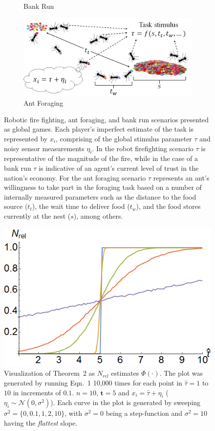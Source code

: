 \documentclass[12pt]{article}
\def\td{\mathbf{t}}   %
\begin{document}
\begin{figure}[ht!]
\begin{subfigure}[t]{0.41\textwidth}
        \caption{Bank Run}
    \end{subfigure}
    \begin{subfigure}[t]{.82\textwidth}
        \centering
        \includegraphics[width=1\textwidth]{figures/foraging.png}
        \caption{Ant Foraging}
    \end{subfigure}    
    \caption{Robotic fire fighting, ant foraging, and bank run scenarios presented as global games. Each player's imperfect estimate of the task is represented by $x_i$, comprising of the global stimulus parameter $\tau$ and noisy sensor measurements $\eta_i$. In the robot firefighting scenario $\tau$ is representative of the magnitude of the fire, while in the case of a bank run $\tau$ is indicative of an agent's current level of trust in the nation's economy. For the ant foraging scenario $\tau$ represents an ant's willingness to take part in the foraging task based on a number of internally measured parameters such as the distance to the food source ($t_t$), the wait time to deliver food ($t_w$), and the food stores currently at the nest ($s$), among others.}    
\end{figure}

\newpage
\begin{figure}[!ht]
	\centering\includegraphics[width=0.7\columnwidth]{figures/thm2fig.png}
	\centering\caption{Visualization of Theorem~2 as $N_{rel}$ estimates $\Phi(\cdot)$. The plot was generated by running Eqn.~1 10,000 times for each point in $\hat{\tau} = 1$ to $10$ in increments of $0.1$. $n = 10$, $\td = 5$ and $x_i = \hat{\tau} + \eta_i$ ($\eta_i \sim\mathcal{N}(0, \sigma^2)$). Each curve in the plot is generated by sweeping $\sigma^2 = \{0, 0.1, 1, 2, 10\}$, with $\sigma^2 = 0$ being a step-function and $\sigma^2 = 10$ having the \emph{flattest} slope.}\label{fig:thm2fig}
\end{figure}
\end{document}
